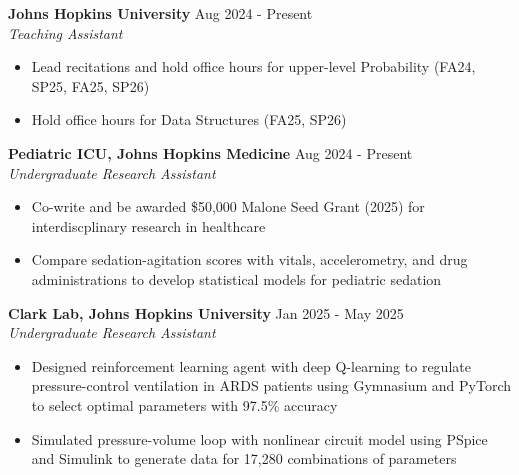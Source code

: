 \documentclass[11pt]{article}       %
\begin{document}
\textbf{Johns Hopkins University} \hfill Aug 2024 - Present \\
\textit{Teaching Assistant} \vspace{-9pt} \\
\begin{itemize}
  \item Lead recitations and hold office hours for upper-level Probability (FA24, SP25, FA25, SP26)
  \item Hold office hours for Data Structures (FA25, SP26)
\end{itemize}

\textbf{Pediatric ICU, Johns Hopkins Medicine} \hfill Aug 2024 - Present\\
\textit{Undergraduate Research Assistant} \vspace{-9pt}
\begin{itemize}
  \item Co-write and be awarded \$50,000 Malone Seed Grant (2025) for interdiscplinary research in healthcare
  \item Compare sedation-agitation scores with vitals, accelerometry, and drug administrations to develop statistical models for pediatric sedation
\end{itemize}

\textbf{Clark Lab, Johns Hopkins University} \hfill Jan 2025 - May 2025 \\
\textit{Undergraduate Research Assistant} \vspace{-9pt} \\
\begin{itemize}
  \item Designed reinforcement learning agent with deep Q-learning to regulate pressure-control ventilation in ARDS patients using Gymnasium and PyTorch to select optimal parameters with 97.5\% accuracy
  \item Simulated pressure-volume loop with nonlinear circuit model using PSpice and Simulink to generate data for 17,280 combinations of parameters
\end{itemize}
\end{document}
